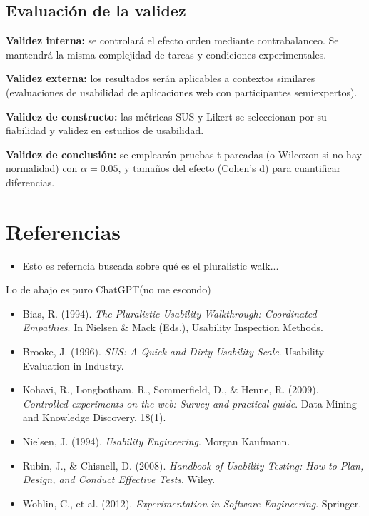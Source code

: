 \documentclass[a4paper,12pt]{report}
\begin{document}
\section{Evaluación de la validez}

\textbf{Validez interna:} se controlará el efecto orden mediante contrabalanceo. Se mantendrá la misma complejidad de tareas y condiciones experimentales.  

\textbf{Validez externa:} los resultados serán aplicables a contextos similares (evaluaciones de usabilidad de aplicaciones web con participantes semiexpertos).  

\textbf{Validez de constructo:} las métricas SUS y Likert se seleccionan por su fiabilidad y validez en estudios de usabilidad.  

\textbf{Validez de conclusión:} se emplearán pruebas t pareadas (o Wilcoxon si no hay normalidad) con $\alpha=0.05$, y tamaños del efecto (Cohen’s d) para cuantificar diferencias.

\chapter*{Referencias}
\begin{itemize}
	\item Esto es referncia buscada sobre qué es el pluralistic walk...\cite{PluralisticWalkthrough}
\end{itemize}


Lo de abajo es puro ChatGPT(no me escondo)
\begin{itemize}
    \item Bias, R. (1994). \textit{The Pluralistic Usability Walkthrough: Coordinated Empathies}. In Nielsen \& Mack (Eds.), Usability Inspection Methods.
    \item Brooke, J. (1996). \textit{SUS: A Quick and Dirty Usability Scale}. Usability Evaluation in Industry.
    \item Kohavi, R., Longbotham, R., Sommerfield, D., \& Henne, R. (2009). \textit{Controlled experiments on the web: Survey and practical guide}. Data Mining and Knowledge Discovery, 18(1).
    \item Nielsen, J. (1994). \textit{Usability Engineering}. Morgan Kaufmann.
    \item Rubin, J., \& Chisnell, D. (2008). \textit{Handbook of Usability Testing: How to Plan, Design, and Conduct Effective Tests}. Wiley.
    \item Wohlin, C., et al. (2012). \textit{Experimentation in Software Engineering}. Springer.
\end{itemize}
\end{document}

